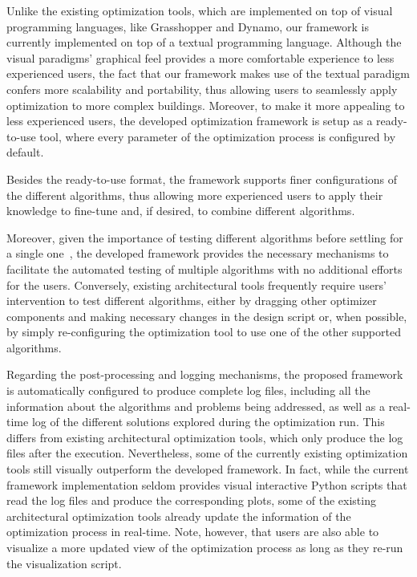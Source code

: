 Unlike the existing optimization tools, which are implemented on top of visual programming languages, like Grasshopper and Dynamo, our framework is currently implemented on top of a textual programming language. Although the visual paradigms' graphical feel provides a more comfortable experience to less experienced users, the fact that our framework makes use of the textual paradigm confers more scalability and portability, thus allowing users to seamlessly apply optimization to more complex buildings. Moreover, to make it more appealing to less experienced users, the developed optimization framework is setup as a ready-to-use tool, where every parameter of the optimization process is configured by default.  

Besides the ready-to-use format, the framework supports finer configurations of the different algorithms, thus allowing more experienced users to apply their knowledge to fine-tune and, if desired, to combine different algorithms. 

Moreover, given the importance of testing different algorithms before settling for a single one~\cite{Wortmann2016BBO}, the developed framework provides the necessary mechanisms to facilitate the automated testing of multiple algorithms with no additional efforts for the users. Conversely, existing architectural tools frequently require users' intervention to test different algorithms, either by dragging other optimizer components and making necessary changes in the design script or, when possible, by simply re-configuring the optimization tool to use one of the other supported algorithms. 

Regarding the post-processing and logging mechanisms, the proposed framework is automatically configured to produce complete log files, including all the information about the algorithms and problems being addressed, as well as a real-time log of the different solutions explored during the optimization run. This differs from existing architectural optimization tools, which only produce the log files after the execution. Nevertheless, some of the currently existing optimization tools still visually outperform the developed framework. In fact, while the current framework implementation seldom provides visual interactive Python scripts that read the log files and produce the corresponding plots, some of the existing architectural optimization tools already update the information of the optimization process in real-time. Note, however, that users are also able to visualize a more updated view of the optimization process as long as they re-run the visualization script. 

